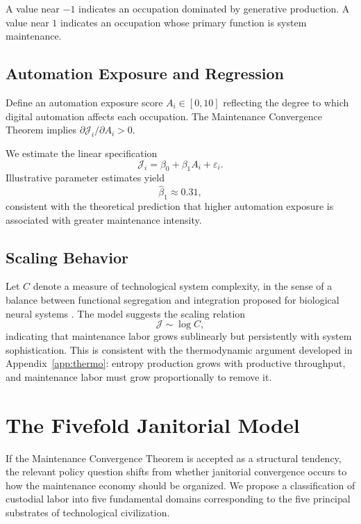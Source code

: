 \documentclass[12pt,a4paper]{article}
\theoremstyle{plain}
\theoremstyle{definition}
\theoremstyle{remark}
\begin{document}
A value near $-1$ indicates an occupation dominated by generative production.
A value near $1$ indicates an occupation whose primary function is system
maintenance.

\subsection{Automation Exposure and Regression}

Define an automation exposure score $A_i \in [0,10]$ reflecting the degree
to which digital automation affects each occupation.  The Maintenance
Convergence Theorem implies $\partial \mathcal{J}_i / \partial A_i > 0$.

We estimate the linear specification
\[
\mathcal{J}_i = \beta_0 + \beta_1 A_i + \varepsilon_i.
\]
Illustrative parameter estimates yield
\[
\hat{\beta}_1 \approx 0.31,
\]
consistent with the theoretical prediction that higher automation exposure is
associated with greater maintenance intensity.

\subsection{Scaling Behavior}

Let $C$ denote a measure of technological system complexity, in the sense of
a balance between functional segregation and integration proposed for
biological neural systems \cite{tononi1994}.  The model
suggests the scaling relation
\[
\mathcal{J} \sim \log C,
\]
indicating that maintenance labor grows sublinearly but persistently with
system sophistication.  This is consistent with the thermodynamic argument
developed in Appendix~\ref{app:thermo}: entropy production grows with
productive throughput, and maintenance labor must grow proportionally to
remove it.

\section{The Fivefold Janitorial Model}
\label{sec:fivefold}

If the Maintenance Convergence Theorem is accepted as a structural tendency,
the relevant policy question shifts from whether janitorial convergence occurs
to how the maintenance economy should be organized.  We propose a
classification of custodial labor into five fundamental domains corresponding
to the five principal substrates of technological civilization.
\end{document}
